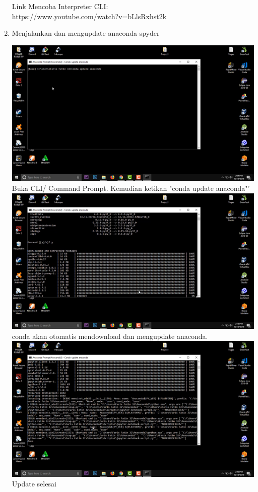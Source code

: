 \begin{enumerate}
Link Mencoba Interpreter CLI: \\
https://www.youtube.com/watch?v=bLlsRxhst2k

\item Menjalankan dan mengupdate anaconda spyder

\includegraphics{gambar/5_1.png}
Buka CLI/ Command Prompt. Kemudian ketikan "conda update anaconda"'\\

\includegraphics{gambar/5_2.png}
conda akan otomatis mendownload dan mengupdate anaconda.\\

\includegraphics{gambar/5_3.png}
Update selesai\\


\end{enumerate}
